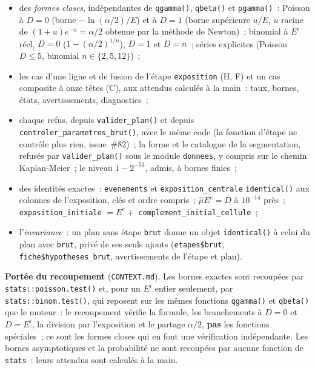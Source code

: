 \documentclass[a4paper,11pt]{article}
\newcommand{\code}[1]{\texttt{\small #1}}
\begin{document}
\begin{itemize}[leftmargin=*, itemsep=2pt]
  \item des \emph{formes closes}, indépendantes de \code{qgamma()},
    \code{qbeta()} et \code{pgamma()}~: Poisson à $D = 0$ (borne
    $-\ln(\alpha/2)/E$) et à $D = 1$ (borne supérieure $u/E$, $u$ racine de
    $(1 + u)e^{-u} = \alpha/2$ obtenue par la méthode de Newton)~; binomial à
    $E^i$ réel, $D = 0$ ($1 - (\alpha/2)^{1/n}$), $D = 1$ et $D = n$~; séries
    explicites (Poisson $D \le 5$, binomial $n \in \{2, 5, 12\}$)~;
  \item les cas d'une ligne et de fusion de l'étape \code{exposition} (H, F)
    et un cas composite à onze têtes (C), aux attendus calculés à la main~:
    taux, bornes, états, avertissements, diagnostics~;
  \item chaque refus, depuis \code{valider\_plan()} et depuis
    \code{controler\_parametres\_brut()}, avec le même code (la fonction
    d'étape ne contrôle plus rien, issue~\#82)~; la forme et le catalogue de
    la segmentation, refusés par \code{valider\_plan()} sous le module
    \code{donnees}, y compris sur le chemin Kaplan-Meier~; le niveau $1 - 2^{-53}$, admis, à bornes
    finies~;
  \item des identités exactes~: \code{evenements} et
    \code{exposition\_centrale} \code{identical()} aux colonnes de
    l'exposition, clés et ordre compris~; $\hat\mu E^c = D$ à $10^{-14}$ près~;
    \code{exposition\_initiale} $= E^c +$ \code{complement\_initial\_cellule}~;
  \item l'\emph{invariance}~: un plan sans étape \code{brut} donne un objet
    \code{identical()} à celui du plan avec \code{brut}, privé de ses seuls
    ajouts (\code{etapes\$brut}, \code{fiche\$hypotheses\_brut},
    avertissements de l'étape et plan).
\end{itemize}

\noindent
\textbf{Portée du recoupement} (\code{CONTEXT.md}). Les bornes exactes sont
recoupées par \code{stats::poisson.test()} et, pour un $E^i$ entier
seulement, par \code{stats::binom.test()}, qui reposent sur les mêmes
fonctions \code{qgamma()} et \code{qbeta()} que le moteur~: le recoupement
vérifie la formule, les branchements à $D = 0$ et $D = E^i$, la division par
l'exposition et le partage $\alpha/2$, \textbf{pas} les fonctions
spéciales~; ce sont les formes closes qui en font une vérification
indépendante. Les bornes asymptotiques et la probabilité ne sont recoupées
par aucune fonction de \code{stats}~: leurs attendus sont calculés à la main.
\end{document}
